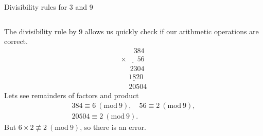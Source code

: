 \documentclass[9pt,aspectratio=169]{beamer}
\newcommand{\Mod}[1]{\ (\mathrm{mod}\ #1)}
\begin{document}
\begin{frame}{Divisibility rules for 3 and 9}
\begin{columns}[T]
\begin{column}{0.5\textwidth}
      The divisibility rule by $9$ allows us quickly check if our arithmetic operations are correct.
      \[
        \begin{array}{c}
        \phantom{\times99}384\\
        \underline{\times\phantom{999}56}\\
        \phantom{\times9}2304\\
        \underline{\phantom\times1820\phantom9}\\
        \phantom\times20504
        \end{array}
      \]
      Lets see remainders of factors and product
      \begin{gather*}
        384 \equiv 6 \Mod{9}, \quad
        56 \equiv 2 \Mod{9}, \\
        20504 \equiv 2 \Mod{9}.
      \end{gather*}
      But $6 \times 2 \not\equiv 2 \Mod{9}$, so there is an error.
    \end{column}
  \end{columns}
\end{frame}
\end{document}
